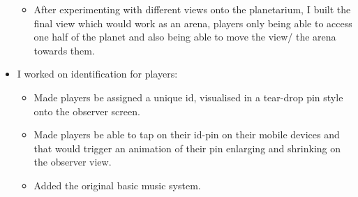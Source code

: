 \documentclass[11pt,a4paper]{article}
\begin{document}
\begin{itemize}
\begin{itemize}
            \item After experimenting with different views onto the planetarium, I built the final view which would work as an arena, players only being able to access one half of the planet and also being able to move the view/ the arena towards them.
          \end{itemize}
          \item I worked on identification for players:
          \begin{itemize}
          \item Made players be assigned a unique id, visualised in a tear-drop pin style onto the observer screen.
          \item Made players be able to tap on their id-pin on their mobile devices and that would trigger an animation of their pin enlarging and shrinking on the observer view.
          \item Added the original basic music system.
          \end{itemize}
        \end{itemize}

        \pagebreak
\end{document}
